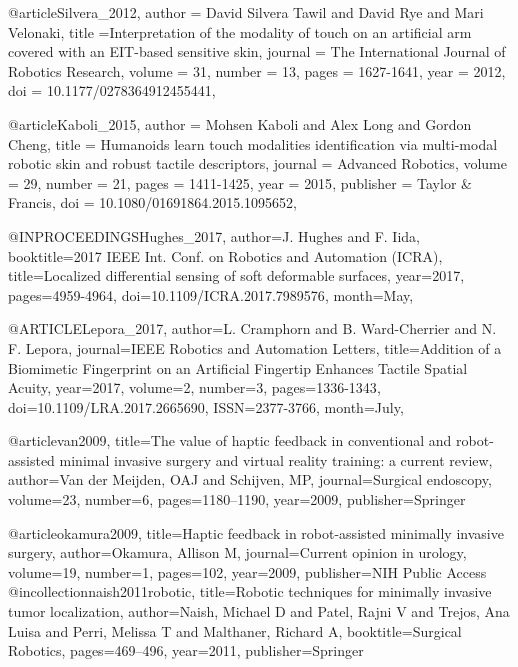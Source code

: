  @article{Silvera_2012,
 	author = {David Silvera Tawil and David Rye and Mari Velonaki},
 	title ={Interpretation of the modality of touch on an artificial arm covered with an EIT-based sensitive skin},
 	journal = {The International Journal of Robotics Research},
 	volume = {31},
 	number = {13},
 	pages = {1627-1641},
 	year = {2012},
 	doi = {10.1177/0278364912455441},
 }
 
 @article{Kaboli_2015,
 	author = {Mohsen Kaboli and Alex Long and Gordon Cheng},
 	title = {Humanoids learn touch modalities identification via multi-modal robotic skin and robust tactile descriptors},
 	journal = {Advanced Robotics},
 	volume = {29},
 	number = {21},
 	pages = {1411-1425},
 	year  = {2015},
 	publisher = {Taylor & Francis},
 	doi = {10.1080/01691864.2015.1095652},
 }
 
 @INPROCEEDINGS{Hughes_2017, 
 	author={J. Hughes and F. Iida}, 
 	booktitle={2017 IEEE Int. Conf. on Robotics and Automation (ICRA)}, 
 	title={Localized differential sensing of soft deformable surfaces}, 
 	year={2017}, 
	pages={4959-4964}, 
 	doi={10.1109/ICRA.2017.7989576},  
 	month={May},}
 
 @ARTICLE{Lepora_2017, 
 	author={L. Cramphorn and B. Ward-Cherrier and N. F. Lepora}, 
 	journal={IEEE Robotics and Automation Letters}, 
 	title={Addition of a Biomimetic Fingerprint on an Artificial Fingertip Enhances Tactile Spatial Acuity}, 
 	year={2017}, 
 	volume={2}, 
 	number={3}, 
 	pages={1336-1343}, 
 	doi={10.1109/LRA.2017.2665690}, 
 	ISSN={2377-3766}, 
 	month={July},}
 
 
 @article{van2009,
 	title={The value of haptic feedback in conventional and robot-assisted minimal invasive surgery and virtual reality training: a current review},
 	author={Van der Meijden, OAJ and Schijven, MP},
 	journal={Surgical endoscopy},
 	volume={23},
 	number={6},
 	pages={1180--1190},
 	year={2009},
 	publisher={Springer}
 }
 
 @article{okamura2009,
 	title={Haptic feedback in robot-assisted minimally invasive surgery},
 	author={Okamura, Allison M},
 	journal={Current opinion in urology},
 	volume={19},
 	number={1},
 	pages={102},
 	year={2009},
 	publisher={NIH Public Access}
 }
@incollection{naish2011robotic,
	title={Robotic techniques for minimally invasive tumor localization},
	author={Naish, Michael D and Patel, Rajni V and Trejos, Ana Luisa and Perri, Melissa T and Malthaner, Richard A},
	booktitle={Surgical Robotics},
	pages={469--496},
	year={2011},
	publisher={Springer}
}

